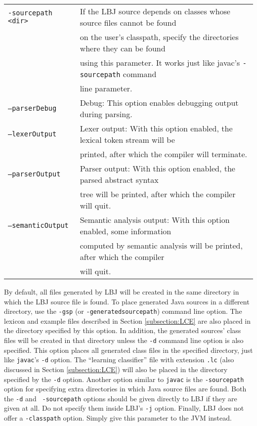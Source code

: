 \begin{center}
\begin{tabular}{ll}
{\tt -sourcepath <dir>} &
If the LBJ source depends on classes whose source files cannot be found \\
& on the user's classpath, specify the directories where they can be found \\
& using this parameter. It works just like javac's {\tt -sourcepath} command
\\
& line parameter.  \vspace{.2cm} \\

{\tt --parserDebug} &
Debug: This option enables debugging output during parsing. \vspace{.2cm} \\

{\tt --lexerOutput} &
Lexer output: With this option enabled, the lexical token stream will be \\
& printed, after which the compiler will terminate. \vspace{.2cm} \\

{\tt --parserOutput} &
Parser output: With this option enabled, the parsed abstract syntax \\
& tree will be printed, after which the compiler will quit. \vspace{.2cm} \\

{\tt --semanticOutput} &
Semantic analysis output: With this option enabled, some information \\
& computed by semantic analysis will be printed, after which the compiler \\
& will quit.
\end{tabular}
\end{center}

\newpage
By default, all files generated by LBJ will be created in the same directory
in which the LBJ source file is found.  To place generated Java sources in a
different directory, use the {\tt -gsp} (or {\tt -generatedsourcepath})
command line option.  The lexicon and example files described in Section
\ref{subsection:LCE} are also placed in the directory specified by this
option.  In addition, the generated sources' class files will be created in
that directory unless the {\tt -d} command line option is also specified.
This option places all generated class files in the specified directory, just
like {\tt javac}'s {\tt -d} option.  The ``learning classifier'' file with
extension {\tt .lc} (also discussed in Section \ref{subsection:LCE}) will also
be placed in the directory specified by the {\tt -d} option.  Another option
similar to {\tt javac} is the {\tt -sourcepath} option for specifying extra
directories in which Java source files are found.  Both the {\tt -d} and {\tt
-sourcepath} options should be given directly to LBJ if they are given at all.
Do not specify them inside LBJ's {\tt -j} option.  Finally, LBJ does not offer
a {\tt -classpath} option.  Simply give this parameter to the JVM instead. \\

